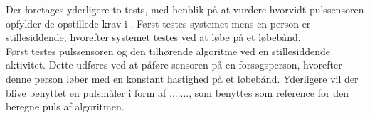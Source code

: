 Der foretages yderligere to tests, med henblik på at vurdere hvorvidt pulssensoren opfylder de opstillede krav i . Først testes systemet mens en person er stillesiddende, hvorefter systemet testes ved at løbe på et løbebånd. \\
Først testes pulssensoren og den tilhørende algoritme ved en stillesiddende aktivitet. Dette udføres ved at påføre sensoren på en forsøgsperson, hvorefter denne person løber med en konstant hastighed på et løbebånd. Yderligere vil der blive benyttet en pulsmåler i form af ......., som benyttes som reference for den beregne puls af algoritmen. 







